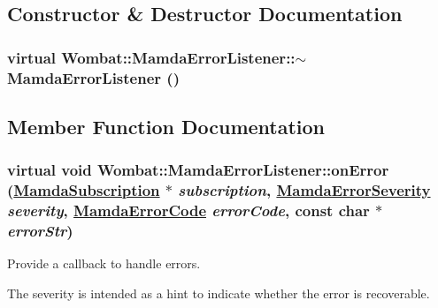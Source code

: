 \subsection{Constructor \& Destructor Documentation}
\hypertarget{classWombat_1_1MamdaErrorListener_dbe5538f6b7c44630de95268e597aa68}{
\subsubsection[$\sim$MamdaErrorListener]{\setlength{\rightskip}{0pt plus 5cm}virtual Wombat::Mamda\-Error\-Listener::$\sim$Mamda\-Error\-Listener ()}}
\label{classWombat_1_1MamdaErrorListener_dbe5538f6b7c44630de95268e597aa68}




\subsection{Member Function Documentation}
\hypertarget{classWombat_1_1MamdaErrorListener_415a2478c568c6b5e5e8d5d8ef7b40ee}{
\subsubsection[onError]{\setlength{\rightskip}{0pt plus 5cm}virtual void Wombat::Mamda\-Error\-Listener::on\-Error (\hyperlink{classWombat_1_1MamdaSubscription}{Mamda\-Subscription} $\ast$ {\em subscription}, \hyperlink{namespaceWombat_10f0aa05514c69e0d8e360af40278c8c}{Mamda\-Error\-Severity} {\em severity}, \hyperlink{namespaceWombat_0bef5aac9df8b606704a54a376f45597}{Mamda\-Error\-Code} {\em error\-Code}, const char $\ast$ {\em error\-Str})}}
\label{classWombat_1_1MamdaErrorListener_415a2478c568c6b5e5e8d5d8ef7b40ee}


Provide a callback to handle errors. 

The severity is intended as a hint to indicate whether the error is recoverable. 